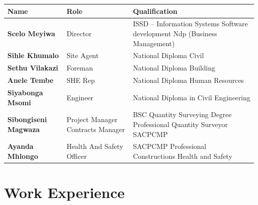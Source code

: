 \documentclass[a4paper,11pt]{article}
\begin{document}
{\color{awenDarkGrey}
\renewcommand{\arraystretch}{1.45}
\begin{tabularx}{\textwidth}{@{} L{4.2cm} L{3.8cm} X @{}}
  \toprule
  \textcolor{awenWhite}{\bfseries Name} & 
  \textcolor{awenWhite}{\bfseries Role} & 
  \textcolor{awenWhite}{\bfseries Qualification} \\
  \midrule
  \textbf{Scelo Meyiwa}      & Director & ISSD – Information Systems Software development \newline Ndp (Business Management) \\
  \textbf{Sihle Khumalo}     & Site Agent & National Diploma Civil \\
  \textbf{Sethu Vilakazi}    & Foreman & National Diploma Building \\
  \textbf{Anele Tembe}       & SHE Rep & National Diploma Human Resources \\
  \textbf{Siyabonga Msomi}   & Engineer & National Diploma in Civil Engineering \\
  \textbf{Sibongiseni Magwaza} & Project Manager \newline Contracts Manager & BSC Quantity Surveying Degree \newline Professional Quantity Surveyor \newline SACPCMP \\
  \textbf{Ayanda Mhlongo}    & Health And Safety Officer & SACPCMP \newline Professional Constructions Health and Safety \\
  \bottomrule
\end{tabularx}
}

\newpage

\section{Work Experience}
\end{document}
